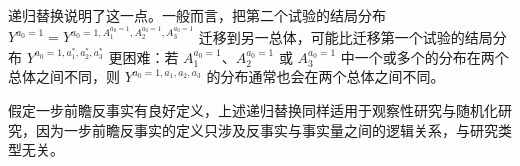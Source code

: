 \begin{techpoint}[递归替换]
递归替换说明了这一点。一般而言，把第二个试验的结局分布 \mbox{$Y^{a_0=1}=Y^{a_0=1,A_1^{a_0=1},A_2^{a_0=1},A_3^{a_0=1}}$} 迁移到另一总体，可能比迁移第一个试验的结局分布 \mbox{$Y^{a_0=1,a_1^{*},a_2^{*},a_3^{*}}$} 更困难：若 $A_1^{a_0=1}$、$A_2^{a_0=1}$ 或 $A_3^{a_0=1}$ 中一个或多个的分布在两个总体之间不同，则 $Y^{a_0=1,a_1,a_2,a_3}$ 的分布通常也会在两个总体之间不同。

假定一步前瞻反事实有良好定义，上述递归替换同样适用于观察性研究与随机化研究，因为一步前瞻反事实的定义只涉及反事实与事实量之间的逻辑关系，与研究类型无关。
\end{techpoint}
\renewcommand{\TPname}{技术注记}
